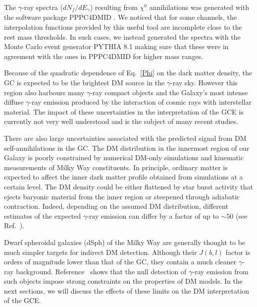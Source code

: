 The $\gamma$-ray spectra ($dN_{f}/dE_{\gamma}$) resulting from $\chi^0$ annihilations was generated with the software package \textsc{PPPC4DMID} \cite{Cirelli_cookbook}.
 We noticed that for some channels, the interpolation functions provided by this useful tool are incomplete close to the rest mass thresholds.
 In such cases, we instead generated the spectra with the Monte Carlo event generator \textsc{PYTHIA 8.1} \cite{Sjostrand:2007gs} making sure that these were in agreement with the ones in \textsc{PPPC4DMID} for higher mass ranges.
 
Because of the quadratic dependence of Eq.~\ref{Phi} on the dark matter density, the GC is expected to be the brightest DM source in the $\gamma$-ray sky. However this region also harbours many $\gamma$-ray compact objects and the Galaxy's most intense diffuse $\gamma$-ray emission produced by the interaction of cosmic rays with interstellar material. The impact of these uncertainties in the interpretation of the GCE is currently not very well understood and is the subject of many recent studies.

There are also large uncertainties associated with the predicted signal from DM self-annihilations in the GC. The DM distribution in the innermost region of our Galaxy is poorly constrained by numerical DM-only simulations and kinematic measurements of Milky Way constituents. In principle, ordinary matter is expected to affect the inner dark matter profile obtained from simulations at a certain level. The DM density could be either flattened by star burst activity that ejects baryonic material from the inner region or steepened through adiabatic contraction. Indeed, depending on the assumed DM distribution, different estimates of the expected $\gamma$-ray emission can differ by a factor of up to $\sim 50$ (see Ref.~\cite{Funk:review,Catena:2009mf}).

Dwarf spheroidal galaxies (dSph) of the Milky Way are generally thought to be much simpler targets for indirect DM detection. Although their  $J(b,l)$ factor is orders of magnitude lower than that of the GC, they contain a much cleaner $\gamma$-ray background. Reference~\cite{Ackermann:2015zua} shows that the null detection of $\gamma$-ray emission from such objects impose strong constraints on the properties of DM models. In the next sections, we will discuss the effects of these limits on the DM interpretation of the GCE. 

